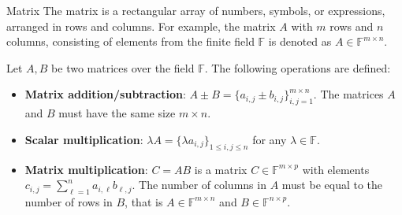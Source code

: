 \documentclass{zkdl-presentation-template}
\begin{document}
    \begin{frame}{Matrix}
        The matrix is a rectangular array of numbers, symbols, or expressions, arranged in rows and 
        columns. For example, the matrix $A$ with $m$ rows and $n$ columns, consisting of elements 
        from the finite field $\mathbb{F}$ is denoted as $A \in \mathbb{F}^{m \times n}$. 

        \begin{definition}
            Let $A,B$ be two matrices over the field $\mathbb{F}$. The following operations are defined:
            \begin{itemize}
                \item \textbf{Matrix addition/subtraction}: $A \pm B = \{a_{i,j} \pm b_{i,j}\}_{i,j=1}^{m \times n}$. The matrices $A$ and $B$ must have the same size $m \times n$.
                \item \textbf{Scalar multiplication}: $\lambda A = \{\lambda a_{i,j}\}_{1\leq i,j \leq n}$ for any $\lambda \in \mathbb{F}$.
                \item \textbf{Matrix multiplication}: $C = AB$ is a matrix $C \in \mathbb{F}^{m \times p}$ with elements $c_{i,j} = \sum_{\ell=1}^{n} a_{i,\ell}b_{\ell,j}$. The number of columns in $A$ must be equal to the number of rows in $B$, that is $A \in \mathbb{F}^{m \times n}$ and $B \in \mathbb{F}^{n \times p}$.
            \end{itemize}
        \end{definition}
    \end{frame}
\end{document}
